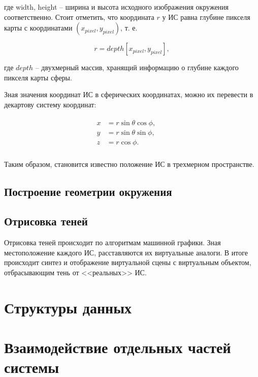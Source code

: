 где width, height -- ширина и высота исходного изображения окружения соответственно. Стоит отметить, что координата $r$ у ИС равна глубине пикселя карты с координатами $(x_{pixel}, y_{pixel})$, т. е. 

\begin{equation}
	r = depth[x_{pixel}, y_{pixel}],
\end{equation}
 
где $depth$ -- двухмерный массив, хранящий информацию о глубине каждого пикселя карты сферы.

Зная значения координат ИС в сферических координатах, можно их перевести в декартову систему координат:

\begin{equation}
	\begin{aligned}
		\begin{split}
			x &= r \sin\theta \cos\phi, &&\\
			y &= r \sin\theta \sin\phi, &&\\
			z &= r \cos\phi. &&\\
		\end{split}
	\end{aligned}
\end{equation}

Таким образом, становится известно положение ИС в трехмерном пространстве.

\subsection{Построение геометрии окружения}



\subsection{Отрисовка теней}

Отрисовка теней происходит по алгоритмам машинной графики. Зная местоположение каждого ИС, расставляются их виртуальные аналоги. В итоге происходит синтез и отображение виртуальной сцены с виртуальным объектом, отбрасывающим тень от <<реальных>> ИС.

\section{Структуры данных}



\section{Взаимодействие отдельных частей системы}

